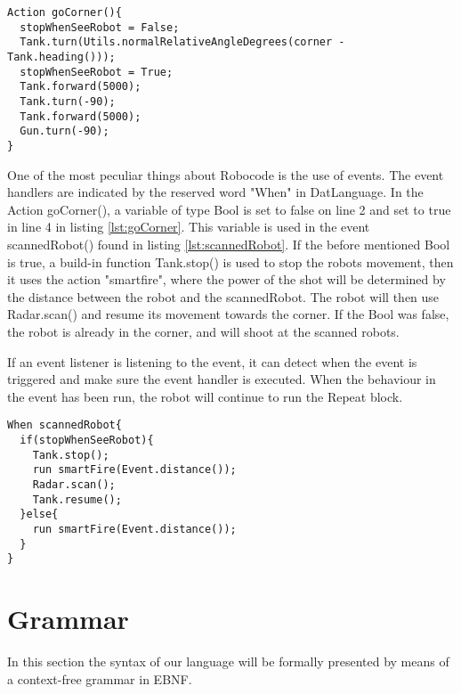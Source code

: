 \begin{lstlisting}[caption={Code listing of the Action goCorner()}, xleftmargin=.2\textwidth, label={lst:goCorner}]
Action goCorner(){
  stopWhenSeeRobot = False;  
  Tank.turn(Utils.normalRelativeAngleDegrees(corner - Tank.heading()));      
  stopWhenSeeRobot = True;
  Tank.forward(5000);
  Tank.turn(-90);
  Tank.forward(5000);
  Gun.turn(-90);
}
\end{lstlisting}

One of the most peculiar things about Robocode is the use of events. The event handlers are indicated by the reserved word "When" in DatLanguage. 
In the Action goCorner(), a variable of type Bool is set to false on line 2 and set to true in line 4 in listing \ref{lst:goCorner}. This variable is used in the event scannedRobot() found in listing \ref{lst:scannedRobot}. If the before mentioned Bool is true, a build-in function Tank.stop() is used to stop the robots movement, then it uses the action "smartfire", where the power of the shot will be determined by the distance between the robot and the scannedRobot. The robot will then use Radar.scan() and resume its movement towards the corner. If the Bool was false, the robot is already in the corner, and will shoot at the scanned robots.

If an event listener is listening to the event, it can detect when the event is triggered and make sure the event handler is executed. When the behaviour in the event has been run, the robot will continue to run the Repeat block.  


\begin{lstlisting}[caption={Code listing of the event scannedRobot()} label=corners3, xleftmargin=.2\textwidth, label={lst:scannedRobot}]
When scannedRobot{
  if(stopWhenSeeRobot){
    Tank.stop();                                     
    run smartFire(Event.distance());
    Radar.scan();                                     
    Tank.resume();                                   
  }else{
    run smartFire(Event.distance());
  }
}
\end{lstlisting}


\section{Grammar}
\label{sec:Grammar}
In this section the syntax of our language will be formally presented by means of a context-free grammar in EBNF.

